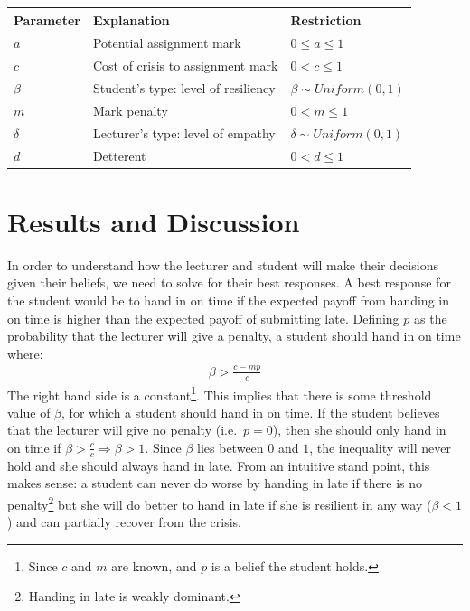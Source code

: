 \documentclass[11pt,preprint, authoryear]{elsarticle}
\let\origtable\table
\let\endorigtable\endtable
\renewenvironment{table}[1][2] {
    \expandafter\origtable\expandafter[H]
} {
    \endorigtable
}
\numberwithin{equation}{section}
\numberwithin{figure}{section}
\numberwithin{table}{section}
\let\rmarkdownfootnote\footnote%
\def\footnote{\protect\rmarkdownfootnote}
\begin{document}
\begin{table}[H]
\centering
\begin{tabular}{lll}
  \toprule
Parameter & Explanation & Restriction \\ 
  \midrule
$a$ & Potential assignment mark & $0\leq a \leq 1$ \\ 
  $c$ & Cost of crisis to assignment mark & $0 < c \leq 1$ \\ 
  $\beta$ & Student's type: level of resiliency & $\beta \sim Uniform(0,1)$  \\ 
  $m$ & Mark penalty & $0 < m \leq 1$ \\ 
  $\delta$ & Lecturer's type: level of empathy & $\delta \sim Uniform(0,1)$ \\ 
  $d$ & Detterent & $0<d \leq 1$ \\ 
   \bottomrule
\end{tabular}
\caption{Game Parameters \label{sum}} 
\end{table}

\hypertarget{results-and-discussion}{%
\section{\texorpdfstring{Results and Discussion
\label{result}}{Results and Discussion }}\label{results-and-discussion}}

In order to understand how the lecturer and student will make their
decisions given their beliefs, we need to solve for their best
responses. A best response for the student would be to hand in on time
if the expected payoff from handing in on time is higher than the
expected payoff of submitting late. Defining \(p\) as the probability
that the lecturer will give a penalty, a student should hand in on time
where: \begin{align*}
\beta>\frac{c-m p}{c}
\end{align*} The right hand side is a constant\footnote{Since \(c\) and
  \(m\) are known, and \(p\) is a belief the student holds.}. This
implies that there is some threshold value of \(\beta\), for which a
student should hand in on time. If the student believes that the
lecturer will give no penalty (i.e.~\(p=0\)), then she should only hand
in on time if \(\beta > \frac{c}{c} \Rightarrow \beta > 1\). Since
\(\beta\) lies between \(0\) and \(1\), the inequality will never hold
and she should always hand in late. From an intuitive stand point, this
makes sense: a student can never do worse by handing in late if there is
no penalty\footnote{Handing in late is weakly dominant.} but she will do
better to hand in late if she is resilient in any way (\(\beta < 1\))
and can partially recover from the crisis.
\end{document}
